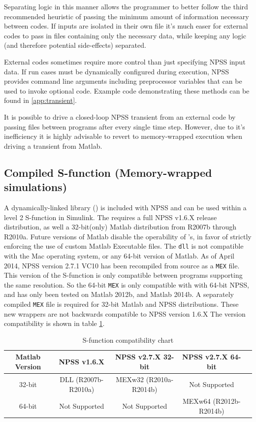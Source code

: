 \documentclass[heading.tex]{subfiles}
\begin{document}
Separating logic in this manner allows the programmer to better follow the third recommended heuristic
of passing the minimum amount of information necessary between codes. If inputs are isolated in their own file
it's much easer for external codes to pass in files containing only the necessary data, 
while keeping any logic (and therefore potential side-effects) separated.

External codes sometimes require more control than just specifying NPSS input data.
If run cases must be dynamically configured during execution,
NPSS provides command line arguments \cite[chap.~2.1]{NPSS}
including preprocessor variables that can be used to invoke optional code.
Example code demonstrating these methods can be found in \cref{app:transient}.

It is possible to drive a closed-loop NPSS transient from an external code
by passing files between programs after every single time step.
However, due to it's inefficiency it is highly advisable to revert to
memory-wrapped execution when driving a transient from Matlab.

\subsection{Compiled S-function (Memory-wrapped simulations)}

A dynamically-linked library () is included with NPSS
and can be used within a level 2 S-function in Simulink. 
The  requires a full NPSS v1.6.X release distribution,
as well a 32-bit(only) Matlab distribution from R2007b through R2010a.
Future versions of Matlab disable the operability of 's,
in favor of strictly enforcing the use of custom Matlab Executable  files.
The \texttt{dll} is not compatible with the Mac operating system, or any 64-bit version
of Matlab. As of April 2014, NPSS version 2.7.1 VC10
has been recompiled from source as a \texttt{MEX} file.
This version of the S-function is only compatible between programs supporting
the same resolution.
So the 64-bit \texttt{MEX} is only compatible with with 64-bit NPSS,
and has only been tested on Matlab 2012b, and Matlab 2014b.
A separately compiled \texttt{MEX} file is required for 32-bit Matlab and NPSS distributions.
These new wrappers are not backwards compatible to NPSS version 1.6.X
The version compatibility is shown in table \ref{tab:Sfunc_Versions}.

\begin{table}[H]
\centering
\begin{adjustwidth}{-1.5cm}{-1.5cm}
\begin{tabular}{|c|c|c|c|c|}
\hline 
Matlab Version & NPSS v1.6.X & NPSS v2.7.X 32-bit & NPSS v2.7.X 64-bit\\ 
\hline \hline
32-bit & DLL (R2007b-R2010a) & MEXw32 (R2010a-R2014b) & Not Supported \\ 
\hline 
64-bit & Not Supported & Not Supported & MEXw64 (R2012b-R2014b) \\ 
\hline 
\end{tabular} 
\end{adjustwidth}
\caption{S-function compatibility chart}
\label{tab:Sfunc_Versions}
\end{table}
\end{document}
